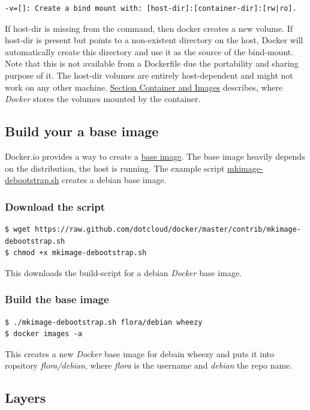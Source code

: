 \documentclass[11pt]{article}
\begin{document}
\begin{verbatim}
-v=[]: Create a bind mount with: [host-dir]:[container-dir]:[rw|ro].
\end{verbatim}
If host-dir is missing from the command, then docker creates a new volume. If host-dir is present but points to a non-existent directory on the host, Docker will automatically create this directory and use it as the source of the bind-mount.
Note that this is not available from a Dockerfile due the portability and sharing purpose of it. The host-dir volumes are entirely host-dependent and might not work on any other machine. \hyperref[sec-2-5]{Section Container and Images} describes, where \emph{Docker} stores the volumes mounted by the container.
\subsection{Build your a base image}
\label{sec-2-3}

Docker.io provides a way to create a \href{http://docs.docker.io/en/latest/articles/baseimages/}{base image}. The base image heavily depends on the distribution, the host is running. The example script \href{https://github.com/dotcloud/docker/blob/master/contrib/mkimage-debootstrap.sh}{mkimage-debootstrap.sh} creates a debian base image.
\subsubsection{Download the script}
\label{sec-2-3-1}


\begin{verbatim}
$ wget https://raw.github.com/dotcloud/docker/master/contrib/mkimage-debootstrap.sh
$ chmod +x mkimage-debootstrap.sh
\end{verbatim}
This downloads the build-script for a debian \emph{Docker} base image.
\subsubsection{Build the base image}
\label{sec-2-3-2}


\begin{verbatim}
$ ./mkimage-debootstrap.sh flora/debian wheezy 
$ docker images -a
\end{verbatim}
This creates a new \emph{Docker} base image for debain wheezy and puts it into ropsitory \emph{flora/debian}, where \emph{flora} is the username and \emph{debian} the repo name.
\subsection{Layers}
\label{sec-2-4}
\end{document}
